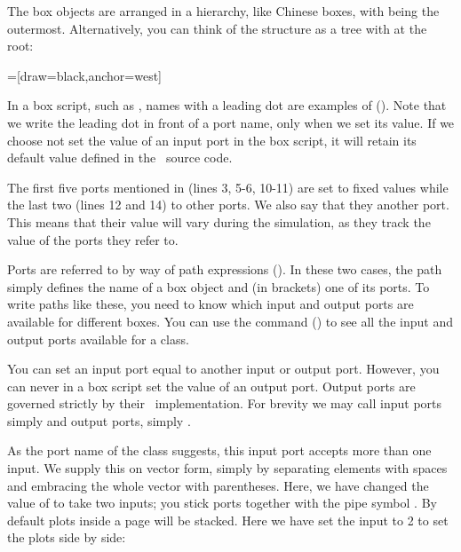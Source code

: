 The box objects are arranged in a hierarchy, like Chinese boxes, with  being the outermost. Alternatively, you can think of the structure as a tree with  at the root:

\medskip
{}=[draw=black,anchor=west]

\bigskip
In a box script, such as , names with a leading dot are examples of  (). Note that we write the leading dot in front of a port name, only when we set its value. If we choose not set the value of an input port in the box script, it will retain its default value defined in the \CPP\ source code.

The first five ports mentioned in  (lines 3, 5-6, 10-11) are set to fixed values while the last two (lines 12 and 14)  to other ports. We also say that they  another port. This means that their value will vary during the simulation, as they track the value of the ports they refer to. 

Ports are referred to by way of path expressions (). In these two cases, the path simply defines the name of a box object and (in brackets) one of its ports. To write paths like these, you need to know which input and output ports are available for different boxes. You can use the  command () to see all the input and output ports available for a class.

You can set an input port equal to another input or output port. However, you can never in a box script set the value of an output port. Output ports are governed strictly by their \CPP\ implementation. For brevity we may call input ports simply  and output ports, simply .

As the port name  of the  class suggests, this input port accepts more than one input. We supply this on vector form, simply by separating elements with spaces and embracing the whole vector with parentheses. Here, we have changed the value of  to take two inputs; you stick ports together with the pipe symbol \code{|}. By default plots inside a page will be stacked. Here we have set the  input to 2 to set the plots side by side:

